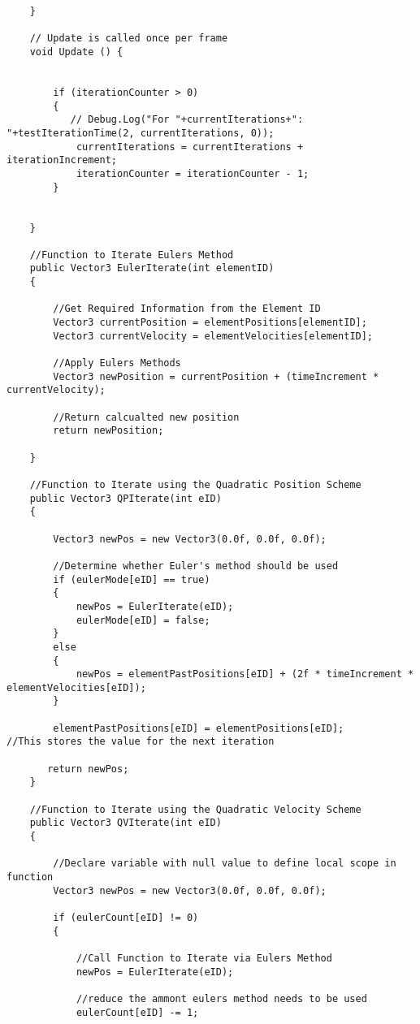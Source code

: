 \begin{mdframed}[linecolor=black, topline=true, bottomline=true,
  leftline=false, rightline=false]
\begin{verbatim}
    }

    // Update is called once per frame
    void Update () {


        if (iterationCounter > 0)
        {
           // Debug.Log("For "+currentIterations+": "+testIterationTime(2, currentIterations, 0));
            currentIterations = currentIterations + iterationIncrement;
            iterationCounter = iterationCounter - 1;
        }


    }

    //Function to Iterate Eulers Method
    public Vector3 EulerIterate(int elementID)
    {

        //Get Required Information from the Element ID
        Vector3 currentPosition = elementPositions[elementID];
        Vector3 currentVelocity = elementVelocities[elementID];

        //Apply Eulers Methods
        Vector3 newPosition = currentPosition + (timeIncrement * currentVelocity);

        //Return calcualted new position
        return newPosition;
        
    }

    //Function to Iterate using the Quadratic Position Scheme
    public Vector3 QPIterate(int eID)
    {

        Vector3 newPos = new Vector3(0.0f, 0.0f, 0.0f);

        //Determine whether Euler's method should be used
        if (eulerMode[eID] == true)
        {
            newPos = EulerIterate(eID);
            eulerMode[eID] = false;
        }
        else
        {
            newPos = elementPastPositions[eID] + (2f * timeIncrement * elementVelocities[eID]);
        }

        elementPastPositions[eID] = elementPositions[eID];         //This stores the value for the next iteration

       return newPos;    
    }

    //Function to Iterate using the Quadratic Velocity Scheme
    public Vector3 QVIterate(int eID)
    {

        //Declare variable with null value to define local scope in function
        Vector3 newPos = new Vector3(0.0f, 0.0f, 0.0f);

        if (eulerCount[eID] != 0)
        {

            //Call Function to Iterate via Eulers Method
            newPos = EulerIterate(eID);

            //reduce the ammont eulers method needs to be used
            eulerCount[eID] -= 1;


\end{verbatim}
\end{mdframed}
